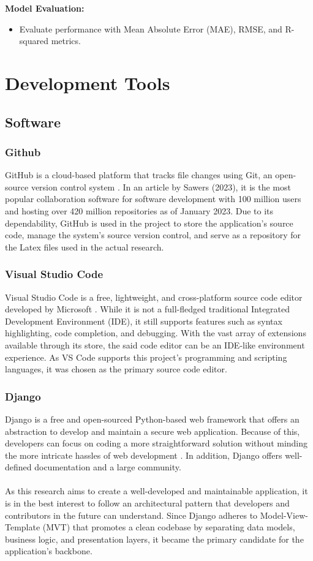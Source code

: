 \textbf{Model Evaluation:}
\begin{itemize}
	\item Evaluate performance with Mean Absolute Error (MAE), RMSE, and R-squared metrics.
\end{itemize}

\section{Development Tools}
\subsection{Software}

\subsubsection{Github}
GitHub is a cloud-based platform that tracks file changes using Git, an open-source version control system \cite{github-no-date}. In an article by Sawers (2023), it is the most popular collaboration software for software development with 100 million users and hosting over 420 million repositories as of January 2023. Due to its dependability, GitHub is used in the project to store the application's source code, manage the system's source version control, and serve as a repository for the Latex files used in the actual research.

\subsubsection{Visual Studio Code}
Visual Studio Code is a free, lightweight, and cross-platform source code editor developed by Microsoft \cite{vscode-2021}. While it is not a full-fledged traditional Integrated Development Environment (IDE), it still supports features such as syntax highlighting, code completion, and debugging. With the vast array of extensions available through its store, the said code editor can be an IDE-like environment experience. As VS Code supports this project's programming and scripting languages, it was chosen as the primary source code editor.

\subsubsection{Django}
Django is a free and open-sourced Python-based web framework that offers an abstraction to develop and maintain a secure web application. Because of this, developers can focus on coding a more straightforward solution without minding the more intricate hassles of web development \cite{django-no-date}. In addition, Django offers well-defined documentation and a large community. \\\\
As this research aims to create a well-developed and maintainable application, it is in the best interest to follow an architectural pattern that developers and contributors in the future can understand. Since Django adheres to Model-View-Template (MVT) that promotes a clean codebase by separating data models, business logic, and presentation layers, it became the primary candidate for the application's backbone. 



